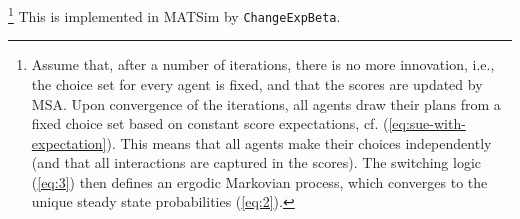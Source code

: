 \footnote{%
%
%
%
%
%
%
%
Assume that, after a number of iterations, there is no more
innovation, i.e., the choice set for every agent is fixed, and that
the scores are updated by MSA.
Upon convergence of the iterations, all agents draw their plans from
a fixed choice set based on constant score expectations, 
cf. (\ref{eq:sue-with-expectation}).
This means that all agents make their choices independently
(and that all interactions are captured in the scores).
The switching logic (\ref{eq:3}) then defines an ergodic Markovian process,
which converges to the unique steady state probabilities (\ref{eq:2}).
%
}
%
This is implemented in MATSim by \lstinline{ChangeExpBeta}.

